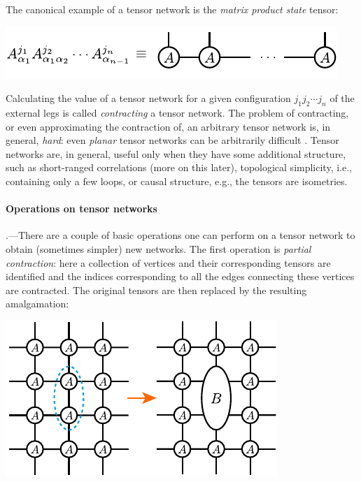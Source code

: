 \documentclass[prl,twocolumn,lengthcheck,superscriptaddress]{revtex4-1}
\theoremstyle{definition}
\theoremstyle{remark}
\begin{document}
The canonical example of a tensor network is the \emph{matrix product state} tensor:
\begin{center}
\includegraphics{mps.pdf}
\end{center}

Calculating the value of a tensor network for a given configuration $j_1j_2\cdots j_n$ of the external legs is called \emph{contracting} a tensor network. The problem of contracting, or even approximating the contraction of, an arbitrary tensor network is, in general, \emph{hard}: even \emph{planar} tensor networks can be arbitrarily difficult \cite{schuch:2007a}. Tensor networks are, in general, useful only when they have some additional structure, such as short-ranged correlations (more on this later), topological simplicity, i.e., containing only a few loops, or causal structure, e.g., the tensors are isometries. 


\paragraph{Operations on tensor networks}\hspace{-1em}.---There are a couple of basic operations one can perform on a tensor network to obtain (sometimes simpler) new networks. The first operation is \emph{partial contraction}: here a collection of vertices and their corresponding tensors are identified and the indices corresponding to all the edges connecting these vertices are contracted. The original tensors are then replaced by the resulting amalgamation: 
\begin{center}
\includegraphics{partialcont.pdf}
\end{center}
\end{document}
